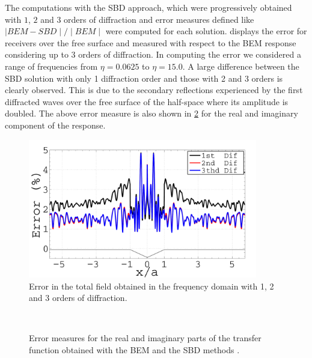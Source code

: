 \documentclass[11pt,letterpaper]{article}
\begin{document}
%
The computations with the SBD approach, which were progressively obtained with $1$, $2$ and $3$ orders of diffraction and error measures defined like $\mid BEM - SBD \mid / \mid BEM \mid$ were computed for each solution.  displays the error for receivers over the free surface and measured with respect to the BEM response considering up to 3 orders of diffraction. In computing the error we considered a range of frequencies from $\eta=0.0625$ to $\eta=15.0$. A large difference between the SBD solution with only 1 diffraction order and those with 2 and 3 orders is clearly observed. This is due to the secondary reflections experienced by the first diffracted waves over the free surface of the half-space where its amplitude is doubled. The above error measure is also shown in \cref{fig:errorrealcomplex} for the real and imaginary component of the response.
%
\begin{figure}[H]
	\centering
	\includegraphics[width=10cm]{IMAGES/Error_Frequency_Domain.pdf}
	\caption{Error in the total field obtained in the frequency domain with 1, 2 and 3 orders of diffraction.
	\label{fig:errorfrec}}
\end{figure}
%
\begin{figure}[H]
	\centering
	\
	\hspace{-.1cm}
	\\
	\caption{Error measures for the real and imaginary parts of the transfer function obtained with the BEM and the SBD methods .}
	\label{fig:errorrealcomplex}
\end{figure}
\end{document}

